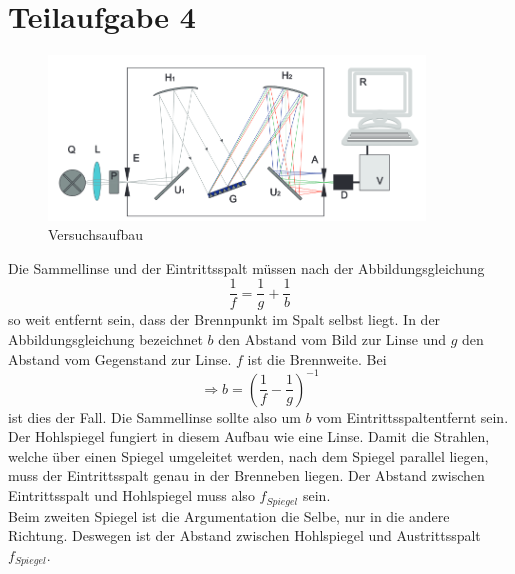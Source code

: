 

\section{Teilaufgabe 4}

\begin{figure}[h]
    \begin{center}
        \includegraphics[width=10cm]{Bilder/SP1.PNG}
    \end{center}
    \caption{Versuchsaufbau}
   \end{figure}
Die Sammellinse und der Eintrittsspalt müssen nach der Abbildungsgleichung 
\begin{equation}
    \frac{1}{f}= \frac{1}{g}+\frac{1}{b}   
\end{equation}
so weit entfernt sein, dass der Brennpunkt im Spalt selbst liegt. In der Abbildungsgleichung bezeichnet $b$ den Abstand vom Bild zur Linse und $g$ den Abstand vom Gegenstand zur Linse. $f$ ist die Brennweite. Bei 
\begin{equation}
    \Rightarrow b = (\frac{1}{f}-\frac{1}{g})^{-1}
\end{equation}
ist dies der Fall. Die Sammellinse sollte also um $b$ vom Eintrittsspaltentfernt sein.\\
Der Hohlspiegel fungiert in diesem Aufbau wie eine Linse. Damit die Strahlen, welche über einen Spiegel umgeleitet werden, nach dem Spiegel parallel liegen, muss der Eintrittsspalt genau in der Brenneben liegen. Der Abstand zwischen Eintrittsspalt und Hohlspiegel muss also $f_{Spiegel}$ sein.\\
Beim zweiten Spiegel ist die Argumentation die Selbe, nur in die andere Richtung. Deswegen ist der Abstand zwischen Hohlspiegel und Austrittsspalt $f_{Spiegel}$.